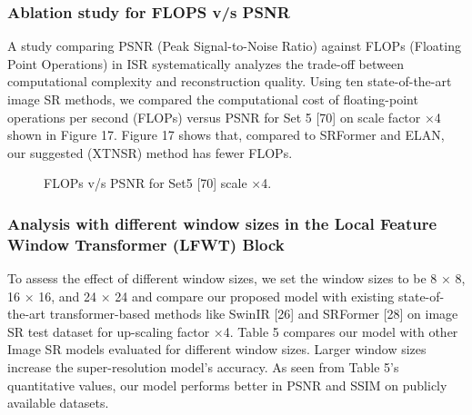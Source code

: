 \documentclass[twocolumn]{svjour3}          %
\begin{document}
\subsubsection{Ablation study for FLOPS v/s PSNR}

A study comparing PSNR (Peak Signal-to-Noise Ratio) against FLOPs (Floating Point Operations) in ISR systematically analyzes the trade-off between computational complexity and reconstruction quality. Using ten state-of-the-art image SR methods, we compared the computational cost of floating-point operations per second (FLOPs) versus PSNR for Set 5 [70] on scale factor ×4 shown in Figure 17. Figure 17 shows that, compared to SRFormer and ELAN, our suggested (XTNSR) method has fewer FLOPs. 

\begin{figure}
  \centering
   \caption {FLOPs v/s PSNR for Set5 [70] scale ×4.}
    \label{fig:20}
\end{figure}

\subsubsection{Analysis with different window sizes in the Local Feature Window Transformer (LFWT) Block}

To assess the effect of different window sizes, we set the window sizes to be 8 × 8, 16 × 16, and 24 × 24 and compare our proposed model with existing state-of-the-art transformer-based methods like SwinIR [26] and SRFormer [28] on image SR test dataset for up-scaling factor ×4. Table 5 compares our model with other Image SR models evaluated for different window sizes. Larger window sizes increase the super-resolution model's accuracy. As seen from Table 5's quantitative values, our model performs better in PSNR and SSIM on publicly available datasets.
\end{document}
